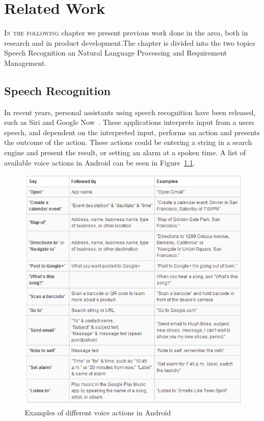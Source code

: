 \chapter{Related Work}
\lettrine[lines=4, loversize=-0.1, lraise=0.1]{I}{n the following} chapter we present previous work done in the area, both in research and in product development.The chapter is divided into the two topics Speech Recognition an Natural Language Processing and Requirement Management. 

\section{Speech Recognition}
In recent years, personal assistants using speech recognition have been released, such as Siri \citep{sirirelease} and Google Now~\citep{googlenowrelease}. These applications interprets input from a users speech, and dependent on the interpreted input, performs an action and presents the outcome of the action. These actions could be entering a string in a search engine and present the result, or setting an alarm at a spoken time. A list of available voice actions in Android can be seen in Figure~\ref{fig:voiceactions}.

\begin{figure}[h]
\centering
\includegraphics[width = 400pt, keepaspectratio = true]{fig/voiceactions.png}
\caption{Examples of different voice actions in Android \citep{voiceactions}}
\label{fig:voiceactions}
\end{figure}
\FloatBarrier


